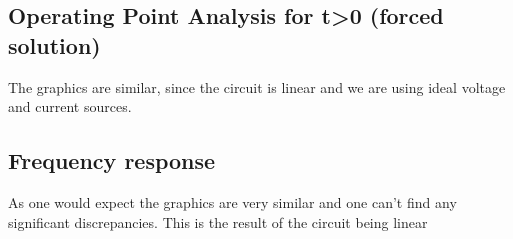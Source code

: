 \subsection{Operating Point Analysis for t>0 (forced solution)}

The graphics are similar, since the circuit is linear and we are using ideal voltage and current sources.


\subsection{Frequency response}

As one would expect the graphics are very similar and one can't find any significant discrepancies. This is the result of the circuit being linear
























































